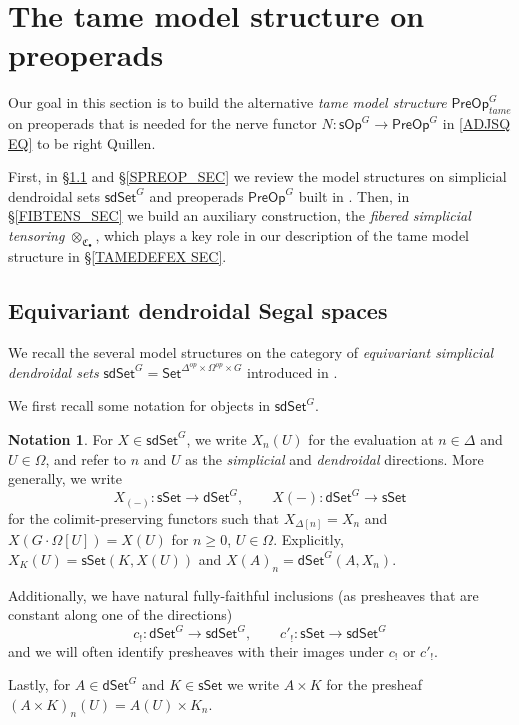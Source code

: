 \documentclass[a4paper,10pt]{article}%
\numberwithin{equation}{section}
\numberwithin{figure}{section}
\theoremstyle{definition} %
\newtheorem{notation}[equation]{Notation}%
\newcommand{\longto}{\longrightarrow}%
\newcommand{\Set}{\ensuremath{\mathsf{Set}}}
\newcommand{\sSet}{\ensuremath{\mathsf{sSet}}}%
\newcommand{\dSet}{\mathsf{dSet}}
\newcommand{\1}{\ensuremath{\mathbbm 1}}%
\begin{document}
\section{The tame model structure on preoperads}
\label{TAME_SEC}


Our goal in this section is to build the alternative 
\emph{tame model structure}
$\mathsf{PreOp}^G_{tame}$
on preoperads that is needed for the nerve functor
$N \colon \mathsf{sOp}^G \to \mathsf{PreOp}^G$
in \eqref{ADJSQ EQ}
to be right Quillen. 

First, in \S \ref{JT_SEC} and \S \ref{SPREOP_SEC} 
we review the model structures on
simplicial dendroidal sets $\mathsf{sdSet}^G$
and preoperads $\mathsf{PreOp}^G$ built in \cite{BP_edss}.
Then, in \S \ref{FIBTENS_SEC}
we build an auxiliary construction, 
the \emph{fibered simplicial tensoring} $\otimes_{\mathfrak{C}_{\bullet}}$,
which plays a key role in our description of
the tame model structure in \S \ref{TAMEDEFEX SEC}. 





\subsection{Equivariant dendroidal Segal spaces}
\label{JT_SEC}


We recall the several model structures on the category of
\textit{equivariant simplicial dendroidal sets}
$\mathsf{sdSet}^G = \Set^{\Delta^{op} \times \Omega^{op} \times G}$
introduced in \cite{BP_edss}.

We first recall some notation for objects in $\mathsf{sdSet}^G$.

\begin{notation}
      For $X \in \mathsf{sdSet}^G$, we write $X_n(U)$ for the evaluation at $n \in \Delta$ and $U \in \Omega$,
      and refer to $n$ and $U$ as the \textit{simplicial} and \textit{dendroidal} directions.
      More generally, we write
      \begin{equation}
            \label{SDSET_EQ}
            X_{(-)} \colon \sSet \to \dSet^G,
            \qquad
            X(-) \colon \dSet^G \to \sSet
      \end{equation}
      for the colimit-preserving functors
      such that $X_{\Delta[n]} = X_n$ and 
      $X\left(G \cdot\Omega[U]\right) = X(U)$ for $n \geq 0$, $U \in \Omega$.
      Explicitly, $X_K(U) = \sSet(K, X(U))$ and $X(A)_n = \dSet^G(A, X_n)$.
      
	Additionally, we have natural fully-faithful inclusions
	(as presheaves that are constant along one of the directions)
\[
	c_{!} \colon \dSet^G \longto \mathsf{sdSet}^G,
		\qquad
	c'_! \colon \sSet \longto \mathsf{sdSet}^G
\]
	and we will often identify presheaves with their images under $c_!$ or $c'_!$.

	Lastly, for $A \in \dSet^G$ and $K \in \sSet$ we write $A \times K$ for the presheaf $(A \times K)_n(U) = A(U) \times K_n$.
\end{notation}
\end{document}
